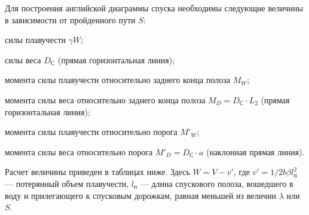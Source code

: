 Для построения английской диаграммы спуска необходимы следующие величины в зависимости от пройденного пути $S$:

силы плавучести $\gamma W$;

силы веса $D_{\text{С}}$ (прямая горизонтальная линия);

момента силы плавучести относительно заднего конца полоза $M_W$;

момента силы веса относительно заднего конца полоза $M_D = D_{\text{С}} \cdot L_2$ (прямая горизонтальная линия);

момента силы плавучести относительно порога $M'_{W}$;

момента силы веса относительно порога $M'_{D} = D_{\text{С}} \cdot a$ (наклонная прямая линия).

Расчет величины приведен в таблицах ниже.
Здесь $W = V - v'$, где $v' = 1/2 b \beta l_{\text{п}}^2$ --- потерянный объем плавучести, $l_{\text{п}}$ --- длина спускового полоза, вошедшего в воду и прилегающего к спусковым дорожкам, равная меньшей из величин $\lambda$ или $S$.

